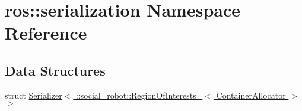 \hypertarget{namespaceros_1_1serialization}{
\section{ros::serialization Namespace Reference}
\label{namespaceros_1_1serialization}
}
\subsection*{Data Structures}
\begin{DoxyCompactItemize}
\item 
struct \hyperlink{structros_1_1serialization_1_1Serializer_3_01_1_1social__robot_1_1RegionOfInterests___3_01ContainerAllocator_01_4_01_4}{Serializer$<$ ::social\_\-robot::RegionOfInterests\_\-$<$ ContainerAllocator $>$ $>$}
\end{DoxyCompactItemize}
